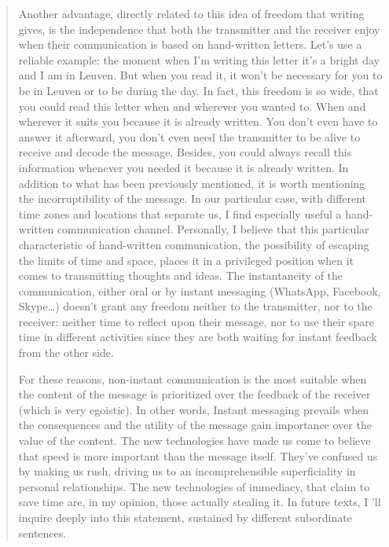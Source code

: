 \documentclass[]{book}
\begin{document}
\begin{quote}
Another advantage, directly related to this idea of freedom that writing gives, is the independence that both the transmitter and the receiver enjoy when their communication is based on hand-written letters. Let's use a reliable example: the moment when I'm writing this letter it's a bright day and I am in Leuven. But when you read it, it won't be necessary for you to be in Leuven or to be during the day. In fact, this freedom is so wide, that you could read this letter when and wherever you wanted to. When and wherever it suits you because it is already written. You don't even have to answer it afterward, you don't even need the transmitter to be alive to receive and decode the message. Besides, you could always recall this information whenever you needed it because it is already written. In addition to what has been previously mentioned, it is worth mentioning the incorruptibility of the message. In our particular case, with different time zones and locations that separate us, I find especially useful a hand-written communication channel. Personally, I believe that this particular characteristic of hand-written communication, the possibility of escaping the limits of time and space, places it in a privileged position when it comes to transmitting thoughts and ideas. The instantaneity of the communication, either oral or by instant messaging (WhatsApp, Facebook, Skype\ldots) doesn't grant any freedom neither to the transmitter, nor to the receiver: neither time to reflect upon their message, nor to use their spare time in different activities since they are both waiting for instant feedback from the other side.

For these reasons, non-instant communication is the most suitable when the content of the message is prioritized over the feedback of the receiver (which is very egoistic). In other words, Instant messaging prevails when the consequences and the utility of the message gain importance over the value of the content. The new technologies have made us come to believe that speed is more important than the message itself. They've confused us by making us rush, driving us to an incomprehensible superficiality in personal relationships. The new technologies of immediacy, that claim to save time are, in my opinion, those actually stealing it. In future texts, I 'll inquire deeply into this statement, sustained by different subordinate sentences.


\end{quote}
\end{document}

